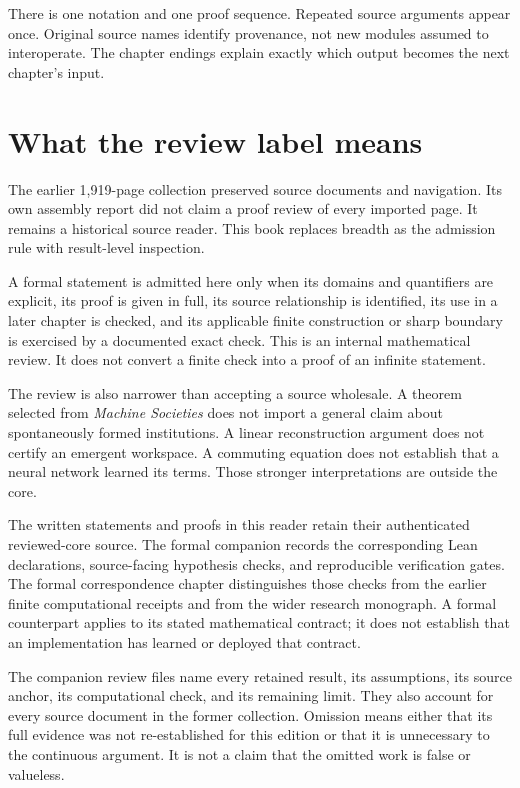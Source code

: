 \documentclass[11pt,oneside,openany]{book}
\theoremstyle{definition}\newtheorem{definition}[theorem]{Definition}
\begin{document}
There is one notation and one proof sequence. Repeated source arguments appear once. Original source names identify provenance, not new modules assumed to interoperate. The chapter endings explain exactly which output becomes the next chapter's input.

\chapter*{What the review label means}
The earlier 1,919-page collection preserved source documents and navigation. Its own assembly report did not claim a proof review of every imported page. It remains a historical source reader. This book replaces breadth as the admission rule with result-level inspection.

A formal statement is admitted here only when its domains and quantifiers are explicit, its proof is given in full, its source relationship is identified, its use in a later chapter is checked, and its applicable finite construction or sharp boundary is exercised by a documented exact check. This is an internal mathematical review. It does not convert a finite check into a proof of an infinite statement.

The review is also narrower than accepting a source wholesale. A theorem selected from \emph{Machine Societies} does not import a general claim about spontaneously formed institutions. A linear reconstruction argument does not certify an emergent workspace. A commuting equation does not establish that a neural network learned its terms. Those stronger interpretations are outside the core.

The written statements and proofs in this reader retain their authenticated reviewed-core source. The formal companion records the corresponding Lean declarations, source-facing hypothesis checks, and reproducible verification gates. The formal correspondence chapter distinguishes those checks from the earlier finite computational receipts and from the wider research monograph. A formal counterpart applies to its stated mathematical contract; it does not establish that an implementation has learned or deployed that contract.

The companion review files name every retained result, its assumptions, its source anchor, its computational check, and its remaining limit. They also account for every source document in the former collection. Omission means either that its full evidence was not re-established for this edition or that it is unnecessary to the continuous argument. It is not a claim that the omitted work is false or valueless.
\end{document}
